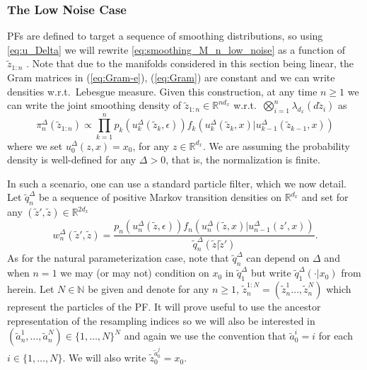 \documentclass[english,13pt]{article}
\numberwithin{equation}{section}
\begin{document}
\subsubsection{The Low Noise Case}\label{sec:ln_add}

PFs are defined to target a sequence of smoothing distributions, so using \eqref{eq:u_Delta} we will rewrite \eqref{eq:smoothing_M_n_low_noise} as a function of $\widetilde{z}_{1:n}$ . Note that due to the manifolds considered in this section being linear, the Gram matrices in (\ref{eq:Gram-e}), (\ref{eq:Gram}) are constant and we can write densities w.r.t.~Lebesgue measure.   Given this construction,  at any time $n\geq 1$ we can write the joint smoothing density of $\widetilde{z}_{1:n}\in\mathbb{R}^{nd_x}$ w.r.t.~$\bigotimes_{i=1}^n \lambda_{d_x}(d\widetilde{z}_i)$ as 
$$
\pi_n^{\Delta}(\widetilde{z}_{1:n}) \propto \prod_{k=1}^n p_k(u_k^{\Delta}(\widetilde{z}_k,\epsilon))
f_k(u_k^{\Delta}(\widetilde{z}_k,x)|u_{k-1}^{\Delta}(\widetilde{z}_{k-1},x))
$$
where we set $u_{0}^{\Delta}(z,x)=x_0$, for any $z\in\mathbb{R}^{d_x}$.  We are assuming the probability density is well-defined for any $\Delta> 0$, that is,  the normalization is finite.

In such a scenario,  one can use a standard particle filter,  which we now detail.  Let $\widetilde{q}_n^{\Delta}$ be a sequence of positive Markov transition densities on $\mathbb{R}^{d_x}$ and set for any $(\widetilde{z}',\widetilde{z})\in\mathbb{R}^{2d_x}$
$$
w_n^{\Delta}(\widetilde{z}',\widetilde{z}) = \frac{p_n(u_n^{\Delta}(\widetilde{z},\epsilon))
f_n(u_n^{\Delta}(\widetilde{z},x)|u_{n-1}^{\Delta}(z',x))}{\widetilde{q}_n^{\Delta}(\widetilde{z}|\widetilde{z}')}.
$$
As for the natural parameterization case, note that $\widetilde{q}_n^{\Delta}$ can depend on $\Delta$ and when $n=1$ we may (or may not) condition on $x_0$
in $\widetilde{q}_1^{\Delta}$ but write $\widetilde{q}_1^{\Delta}(\cdot|x_0)$ from herein.
Let $N\in\mathbb{N}$ be given and denote for any $n\geq 1$,  $\widetilde{z}_n^{1:N}=(\widetilde{z}_n^{1}\dots,\widetilde{z}_n^{N})$ which represent the particles of the PF.   It will prove useful to use the ancestor representation of the resampling indices so we will also be interested in $(\widetilde{a}_n^1,\dots,\widetilde{a}_n^N)\in\{1,\dots,N\}^N$ and again we use the convention that $\widetilde{a}_0^i=i$ for each $i\in\{1,\dots,N\}$.  We will also write $\widetilde{z}_{0}^{\widetilde{a}_{0}^j}=x_0$.  
\end{document}
